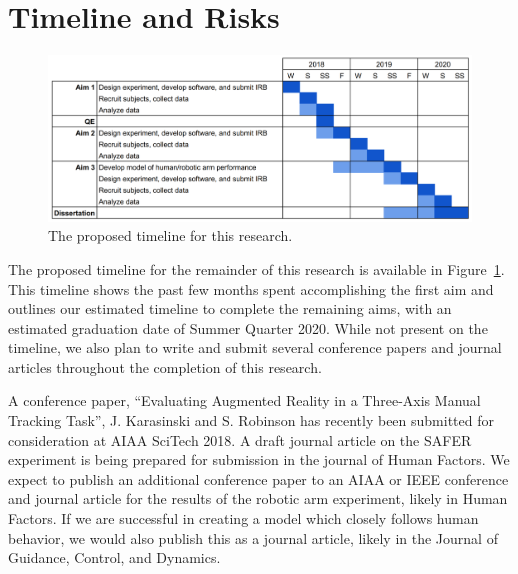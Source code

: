 \documentclass[float=false, crop=false]{standalone}
\begin{document}
\section{Timeline and Risks}
\begin{figure}[h!]
    \begin{center}
        \includegraphics[width=\linewidth]{./../img/image1.png}
        \caption{The proposed timeline for this research.}
        \label{timeline}
    \end{center}
\end{figure}

The proposed timeline for the remainder of this research is available in Figure~\ref{timeline}.
This timeline shows the past few months spent accomplishing the first aim and outlines our estimated timeline to complete the remaining aims, with an estimated graduation date of Summer Quarter 2020.
While not present on the timeline, we also plan to write and submit several conference papers and journal articles throughout the completion of this research.

A conference paper, ``Evaluating Augmented Reality in a Three-Axis Manual Tracking Task'', J. Karasinski and S. Robinson has recently been submitted for consideration at AIAA SciTech 2018.
A draft journal article on the SAFER experiment is being prepared for submission in the journal of Human Factors.
We expect to publish an additional conference paper to an AIAA or IEEE conference and journal article for the results of the robotic arm experiment, likely in Human Factors.
If we are successful in creating a model which closely follows human behavior, we would also publish this as a journal article, likely in the Journal of Guidance, Control, and Dynamics.
\end{document}
